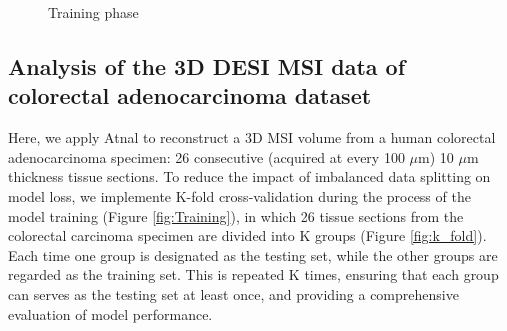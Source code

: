 \documentclass[journal=jacsat,manuscript=article]{achemso}
\begin{document}
\begin{figure}[htbp]
\caption{Training phase}
\label{fig:Training_pro}
\end{figure}
\subsection{Analysis of the 3D DESI MSI data of colorectal adenocarcinoma dataset}
Here, we apply Atnal to reconstruct a 3D MSI volume from a human colorectal 
adenocarcinoma specimen: 26 consecutive 
(acquired at every 100 $\mu$m) 10 $\mu$m 
thickness tissue sections. 
To reduce the impact of imbalanced data splitting on model loss, 
we implemente K-fold cross-validation during the process of the model 
training (Figure \ref{fig:Training}), in which 26 tissue sections 
from the colorectal 
carcinoma specimen are divided into K groups (Figure \ref{fig:k_fold}). 
Each time one group is designated as the testing set, while the other 
groups are regarded as the training set. This is repeated K times, 
ensuring that each group can serves as the testing set at least once, and providing a 
comprehensive evaluation of model performance.
\end{document}

